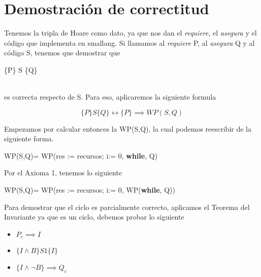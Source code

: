 \documentclass[10pt,a4paper]{article}
\begin{document}


\section{Demostración de correctitud}

Tenemos la tripla de Hoare como dato, ya que nos dan el \textit{requiere}, el \textit{asegura} y el código que implementa en smallang. Si llamamos al \textit{requiere} P, al \textit{asegura} Q y al código S, tenemos que demostrar que 

 \begin{center}
     \{P\} S \{Q\}
 \end{center}

\\

es correcta respecto de S. Para eso, aplicaremos la siguiente formula
 \begin{center}
  $$  \{P\} S \{Q\} \leftrightarrow   \{P\} \implies WP(S,Q) $$
 \end{center}

Empezamos por calcular entonces la WP(S,Q), la cual podemos reescribir de la siguiente forma.

 \begin{center}
   WP(S,Q)= WP(res := recursos; i:= 0, \textbf{while}, Q)
 \end{center}
 \vspace{10mm}
Por el Axioma 1, tenemos lo siguiente

 \begin{center}
   WP(S,Q)= WP(res := recursos; i:= 0, WP(\textbf{while}, Q))
 \end{center}

Para demostrar que el ciclo es parcialmente correcto, aplicamos el Teorema del Invariante ya que es un ciclo, debemos probar lo siguiente

\begin{itemize}
	\item $P_{c} \implies I$
	\item $\{I \wedge B\} S1 \{I\}$
	\item $\{I \wedge \neg B\} \implies Q_{c} $
\end{itemize}
\end{document}
